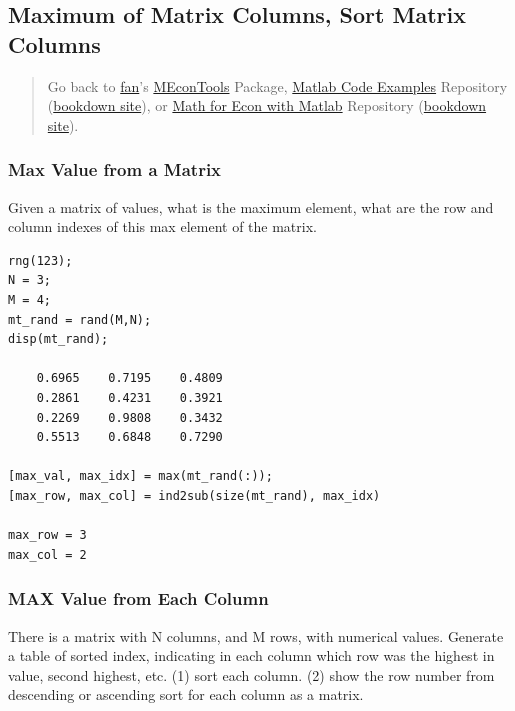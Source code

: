 \documentclass[
]{book}
\begin{document}
\hypertarget{maximum-of-matrix-columns-sort-matrix-columns}{%
\subsection{Maximum of Matrix Columns, Sort Matrix Columns}\label{maximum-of-matrix-columns-sort-matrix-columns}}

\begin{quote}
Go back to \href{http://fanwangecon.github.io/}{fan}'s \href{https://fanwangecon.github.io/MEconTools/}{MEconTools} Package, \href{https://fanwangecon.github.io/M4Econ/}{Matlab Code Examples} Repository (\href{https://fanwangecon.github.io/M4Econ/bookdown}{bookdown site}), or \href{https://fanwangecon.github.io/Math4Econ/}{Math for Econ with Matlab} Repository (\href{https://fanwangecon.github.io/Math4Econ/bookdown}{bookdown site}).
\end{quote}

\hypertarget{max-value-from-a-matrix}{%
\subsubsection{Max Value from a Matrix}\label{max-value-from-a-matrix}}

Given a matrix of values, what is the maximum element, what are the row
and column indexes of this max element of the matrix.

\begin{verbatim}
rng(123);
N = 3;
M = 4;
mt_rand = rand(M,N);
disp(mt_rand);

    0.6965    0.7195    0.4809
    0.2861    0.4231    0.3921
    0.2269    0.9808    0.3432
    0.5513    0.6848    0.7290

[max_val, max_idx] = max(mt_rand(:));
[max_row, max_col] = ind2sub(size(mt_rand), max_idx)

max_row = 3
max_col = 2
\end{verbatim}

\hypertarget{max-value-from-each-column}{%
\subsubsection{MAX Value from Each Column}\label{max-value-from-each-column}}

There is a matrix with N columns, and M rows, with numerical values.
Generate a table of sorted index, indicating in each column which row
was the highest in value, second highest, etc. (1) sort each column. (2)
show the row number from descending or ascending sort for each column as
a matrix.
\end{document}
